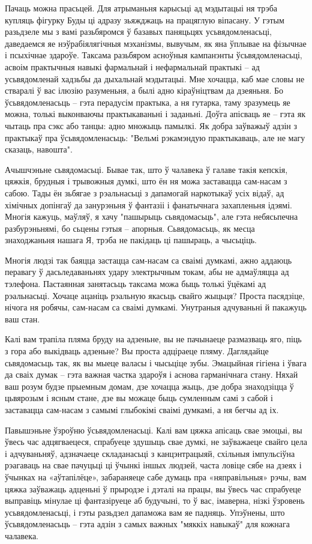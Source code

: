 Пачаць можна прасьцей. Для атрыманьня карысьці ад мэдытацыі ня трэба купляць фігурку Буды ці адразу зьяжджаць на працяглую віпасану. У гэтым разьдзеле мы з вамі разьбяромся ў базавых паняцьцях усьвядомленасьці, даведаемся яе нэўрабіялягічныя мэханізмы, вывучым, як яна ўплывае на фізычнае і псыхічнае здароўе. Таксама разьбяром асноўныя кампанэнты ўсьвядомленасьці, асвоім практычныя навыкі фармальнай і нефармальнай практыкі – ад усьвядомленай хадзьбы да дыхальнай мэдытацыі. Мне хочацца, каб мае словы не стваралі ў вас ілюзію разуменьня, а былі адно кіраўніцтвам да дзеяньня. Бо ўсьвядомленасьць – гэта перадусім практыка, а ня гутарка, таму зразумець яе можна, толькі выконваючы практыкаваньні і заданьні. Доўга апісваць яе – гэта як чытаць пра сэкс або танцы: адно множыць памылкі. Як добра заўважыў адзін з практыкаў пра ўсьвядомленасьць: "Вельмі рэкамэндую практыкаваць, але не магу сказаць, навошта".

Ачышчэньне сьвядомасьці. Бывае так, што ў чалавека ў галаве такія кепскія, цяжкія, брудныя і трывожныя думкі, што ён ня можа заставацца сам-насам з сабою. Тады ён зьбягае з рэальнасьці з дапамогай наркотыкаў усіх відаў, ад хімічных допінгаў да занурэньня ў фантазіі і фанатычнага захапленьня ідэямі. Многія кажуць, маўляў, я хачу "пашырыць сьвядомасьць", але гэта небясьпечна разбурэньнямі, бо сьцены гэтыя – апорныя. Сьвядомасьць, як месца знаходжаньня нашага Я, трэба не пакідаць ці пашыраць, а чысьціць.

Многія людзі так баяцца застацца сам-насам са сваімі думкамі, ажно аддаюць перавагу ў дасьледаваньнях удару электрычным токам, абы не адмаўляцца ад тэлефона. Пастаянная занятасьць таксама можа быць толькі ўцёкамі ад рэальнасьці. Хочаце ацаніць рэальную якасьць свайго жыцьця? Проста пасядзіце, нічога ня робячы, сам-насам са сваімі думкамі. Унутраныя адчуваньні й пакажуць ваш стан.

Калі вам трапіла пляма бруду на адзеньне, вы не пачынаеце размазваць яго, піць з гора або выкідваць адзеньне? Вы проста адціраеце пляму. Даглядайце сьвядомасьць так, як вы мыеце валасы і чысьціце зубы. Эмацыйная гігіена і ўвага да сваіх думак – гэта важная частка здароўя і аснова гарманічнага стану. Няхай ваш розум будзе прыемным домам, дзе хочацца жыць, дзе добра знаходзіцца ў цьвярозым і ясным стане, дзе вы можаце быць сумленным самі з сабой і заставацца сам-насам з самымі глыбокімі сваімі думкамі, а ня бегчы ад іх.

Павышэньне ўзроўню ўсьвядомленасьці. Калі вам цяжка апісаць свае эмоцыі, вы ўвесь час адцягваецеся, спрабуеце здушыць свае думкі, не заўважаеце свайго цела і адчуваньняў, адзначаеце складанасьці з канцэнтрацыяй, схільныя імпульсіўна рэагаваць на свае пачуцьці ці ўчынкі іншых людзей, часта ловіце сябе на дзеях і ўчынках на «аўтапілёце», забараняеце сабе думаць пра «няправільныя» рэчы, вам цяжка заўважаць адценьні ў прыродзе і дэталі на працы, вы ўвесь час спрабуеце выправіць мінулае ці фантазіруеце аб будучыні, то ў вас, імаверна, нізкі ўзровень усьвядомленасьці, і гэты разьдзел дапаможа вам яе падняць. Упэўнены, што ўсьвядомленасьць – гэта адзін з самых важных "мяккіх навыкаў" для кожнага чалавека.


